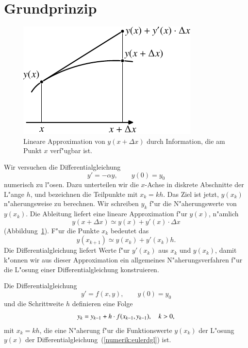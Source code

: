 \section{Grundprinzip}
\begin{figure}
\centering
\includegraphics{chapters/images/numerik-2.pdf}
\caption{Lineare Approximation von $y(x+\Delta x)$ durch Information,
die am Punkt $x$ verf"ugbar ist.
\label{numerik:lineareapproximation}}
\end{figure}
Wir versuchen die Differentialgleichung
\begin{equation}
y'=-\alpha y,\qquad y(0)=y_0
\label{numerik:expdgl}
\end{equation}
numerisch zu l"osen. 
Dazu unterteilen wir die $x$-Achse in diskrete Abschnitte der L"ange $h$,
und bezeichnen die Teilpunkte mit $x_k=kh$.
Das Ziel ist jetzt, $y(x_k)$ n"aherungsweise zu berechnen.
Wir schreiben $y_k$ f"ur die N"aherungswerte von $y(x_k)$.
Die Ableitung liefert eine lineare Approximation f"ur $y(x)$,
n"amlich
\[
y(x+\Delta x)\simeq y(x) + y'(x)\cdot\Delta x
\]
(Abbildung~\ref{numerik:lineareapproximation}).
F"ur die Punkte $x_k$ bedeutet das
\[
y(x_{k+1})\simeq y(x_{k})+y'(x_k)h.
\]
Die Differentialgleichung liefert Werte f"ur $y'(x_k)$ aus $x_k$ und $y(x_k)$,
damit k"onnen wir aus dieser Approximation ein allgemeines
N"aherungsverfahren f"ur die L"osung einer Differentialgleichung
konstruieren.

\begin{satz}
Die Differentialgleichung
\begin{equation}
y'=f(x,y),\qquad y(0)=y_0
\label{numerik:eulerdgl}
\end{equation}
und die Schrittweite $h$ definieren eine Folge 
\[
y_{\mathstrut k}=y_{k-1} + h\cdot f(x_{k-1}, y_{k-1}),\quad k>0,
\]
mit $x_k=kh$,
die eine N"aherung f"ur die Funktionswerte $y(x_k)$ der L"osung $y(x)$
der Differentialgleichung~(\ref{numerik:eulerdgl}) ist.
\end{satz}

